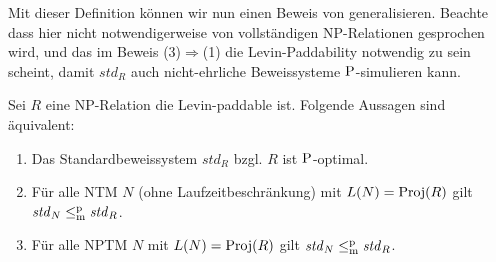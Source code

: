 Mit dieser Definition können wir nun einen Beweis von \textcite[Thm. 5.2]{messner_simulation_2001} generalisieren. Beachte dass hier nicht notwendigerweise von vollständigen NP-Relationen gesprochen wird, und das im Beweis (3)$\Rightarrow$(1) die Levin-Paddability notwendig zu sein scheint, damit $\mathit{std}_R$ auch nicht-ehrliche Beweissysteme $\P$-simulieren kann.
\begin{lemma}\label{lemma:stdps-q}
    Sei $R$ eine NP-Relation die Levin-paddable ist. Folgende Aussagen sind äquivalent:
    \begin{enumerate}
        \item Das Standardbeweissystem $\mathit{std}_R$ bzgl. $R$ ist $\P$-optimal.
        \item Für alle NTM $N$ (ohne Laufzeitbeschränkung) mit $L(N)=\Proj(R)$ gilt $\mathit{std}_N\leqmp\mathit{std}_R$.
        \item Für alle NPTM $N$  mit $L(N)=\Proj(R)$ gilt $\mathit{std}_N\leqmp\mathit{std}_R$.
    \end{enumerate}
\end{lemma}
